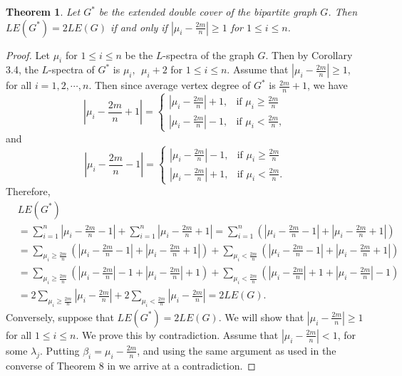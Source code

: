 \documentclass[12pt,a4paper]{amsart}
\newtheorem{theorem}{Theorem}[section]
\theoremstyle{theorem}
\theoremstyle{definition}
\numberwithin{equation}{section} \makeatletter
\begin{document}
\begin{theorem}
Let $G^*$ be the extended double cover of the bipartite graph $G$. Then $LE(G^*)=2 LE(G)$ if and only if $|\mu_i-\frac{2m}{n}|\geq 1$ for $1\leq i\leq n$.
\end{theorem}
\begin{proof}
 Let $\mu_i$ for $1\leq i\leq n$ be the $L$-spectra of the graph $G$. Then by Corollary 3.4, the $L$-spectra of $G^*$ is $\mu_i,~~ \mu_i+2$ for $1\leq i\leq n$. Assume that $|\mu_i-\frac{2m}{n}|\geq 1$, for all $i=1,2,\cdots,n$. Then since average vertex degree of $G^*$ is $\frac{2m}{n}+1$, we have
 $$|\mu_i-\frac{2m}{n}+1|=\left \{\begin{array}{lr}|\mu_i-\frac{2m}{n}|+1, &\mbox{if $\mu_i \geq \frac{2m}{n}$}\\
 |\mu_i-\frac{2m}{n}|-1, &\mbox{if $\mu_i<\frac{2m}{n},$}
 \end{array} \right.$$
 and
 $$|\mu_i-\frac{2m}{n}-1|=\left \{\begin{array}{lr}|\mu_i-\frac{2m}{n}|-1, &\mbox{if $\mu_i \geq \frac{2m}{n}$}\\
  |\mu_i-\frac{2m}{n}|+1, &\mbox{if $\mu_i<\frac{2m}{n}.$}
  \end{array} \right.$$
  Therefore,
 \begin{align*}
&LE(G^*)\\&=\sum\limits_{i=1}^{n}|\mu_i-\frac{2m}{n}-1|+\sum\limits_{i=1}^{n}|\mu_i-\frac{2m}{n}+1|
=\sum\limits_{i=1}^{n} \left (|\mu_i-\frac{2m}{n}-1|+|\mu_i-\frac{2m}{n}+1| \right)\\&=\sum_{\mu_i \geq \frac{2m}{n}} \left (|\mu_i-\frac{2m}{n}-1|+|\mu_i-\frac{2m}{n}+1| \right)+\sum_{\mu_i<\frac{2m}{n}} \left (|\mu_i-\frac{2m}{n}-1|+|\mu_i-\frac{2m}{n}+1| \right)\\&
=\sum_{\mu_i \geq \frac{2m}{n}} \left (|\mu_i-\frac{2m}{n}|-1+|\mu_i-\frac{2m}{n}|+1 \right)+\sum_{\mu_i<\frac{2m}{n}} \left (|\mu_i-\frac{2m}{n}|+1+|\mu_i-\frac{2m}{n}|-1 \right)\\&
=2\sum_{\mu_i \geq \frac{2m}{n}} |\mu_i-\frac{2m}{n}| +2\sum_{\mu_i<\frac{2m}{n}} |\mu_i-\frac{2m}{n}|=2 LE(G).
 \end{align*}
 Conversely, suppose that $LE(G^*)=2 LE(G)$. We will show that $|\mu_i-\frac{2m}{n}|\geq 1$ for all $1\leq i\leq n$. We prove this by contradiction. Assume that $|\mu_i-\frac{2m}{n}|< 1$, for some $\lambda_j$. Putting $\beta_i=\mu_i-\frac{2m}{n}$, and using the same argument as used in the converse of Theorem 8 in \cite{bva} we arrive at a contradiction.
 \end{proof}
\end{document}
